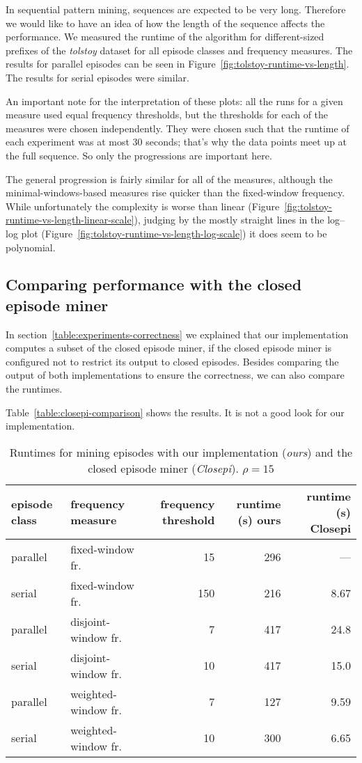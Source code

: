 In sequential pattern mining, sequences are expected to be very long. Therefore we would like to have an idea of how the length of the sequence affects the performance. We measured the runtime of the algorithm for different-sized prefixes of the \emph{tolstoy} dataset for all episode classes and frequency measures. The results for parallel episodes can be seen in Figure~\ref{fig:tolstoy-runtime-vs-length}. The results for serial episodes were similar.

An important note for the interpretation of these plots: all the runs for a given measure used equal frequency thresholds, but the thresholds for each of the measures were chosen independently. They were chosen such that the runtime of each experiment was at most 30 seconds; that's why the data points meet up at the full sequence. So only the progressions are important here.

The general progression is fairly similar for all of the measures, although the minimal-windows-based measures rise quicker than the fixed-window frequency. While unfortunately the complexity is worse than linear (Figure~\ref{fig:tolstoy-runtime-vs-length-linear-scale}), judging by the mostly straight lines in the log--log plot (Figure~\ref{fig:tolstoy-runtime-vs-length-log-scale}) it does seem to be polynomial.

\subsection{Comparing performance with the closed episode miner}

In section~\ref{table:experiments-correctness} we explained that our implementation computes a subset of the closed episode miner, if the closed episode miner is configured not to restrict its output to closed episodes. Besides comparing the output of both implementations to ensure the correctness, we can also compare the runtimes.

Table~\ref{table:closepi-comparison} shows the results. It is not a good look for our implementation.

\begin{table}
\begin{tabulary}{\textwidth}{L|l|R|R|R}
episode class & frequency measure & frequency threshold & runtime (s) ours & runtime (s) Closepi \\
\hline
parallel & fixed-window fr. & 15 & 296 & --- \\
serial & fixed-window fr. & 150 & 216 & 8.67 \\
parallel & disjoint-window fr. & 7 & 417 & 24.8 \\
serial & disjoint-window fr. & 10 & 417 & 15.0 \\
parallel & weighted-window fr. & 7 & 127 & 9.59 \\
serial & weighted-window fr. & 10 & 300 & 6.65 \\
\end{tabulary}
\caption{Runtimes for mining episodes with our implementation (\emph{ours}) and the closed episode miner (\emph{Closepi}). $ \rho = 15 $}
\end{table}

